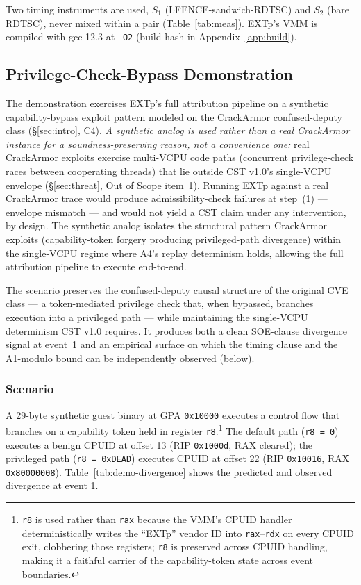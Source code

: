 \documentclass[conference]{IEEEtran}
\begin{document}
Two timing instruments are used, $S_1$ (LFENCE-sandwich-RDTSC) and
$S_2$ (bare RDTSC), never mixed within a pair (Table~\ref{tab:meas}).
EXTp's VMM is compiled with gcc 12.3
at \texttt{-O2} (build hash in Appendix~\ref{app:build}).

\subsection{Privilege-Check-Bypass Demonstration}\label{sec:eval-demo}

The demonstration exercises EXTp's full attribution pipeline on a
synthetic capability-bypass exploit pattern modeled on the
CrackArmor confused-deputy class (\S\ref{sec:intro}, C4).
\emph{A synthetic analog is used rather than a real CrackArmor
instance for a soundness-preserving reason, not a convenience one:}
real CrackArmor exploits exercise multi-VCPU code paths (concurrent
privilege-check races between cooperating threads) that lie outside
CST v1.0's single-VCPU envelope (\S\ref{sec:threat}, Out of Scope
item~1). Running EXTp against a real CrackArmor trace would produce
admissibility-check failures at step~(1) --- envelope mismatch ---
and would not yield a CST claim under any intervention, by design.
The synthetic analog isolates the structural pattern CrackArmor
exploits (capability-token forgery producing privileged-path
divergence) within the single-VCPU regime where A4's replay
determinism holds, allowing the full attribution pipeline to
execute end-to-end.

The scenario preserves the confused-deputy causal structure of the
original CVE class --- a token-mediated privilege check that, when
bypassed, branches execution into a privileged path --- while
maintaining the single-VCPU determinism CST v1.0 requires. It
produces both a clean SOE-clause divergence signal at event~1 and
an empirical surface on which the timing clause and the A1-modulo
bound can be independently observed (below).

\subsubsection{Scenario}

A 29-byte synthetic guest binary at GPA \texttt{0x10000} executes a
control flow that branches on a capability token held in register
\texttt{r8}.\footnote{\texttt{r8} is used rather than \texttt{rax}
because the VMM's CPUID handler deterministically writes the
``EXTp'' vendor ID into \texttt{rax}--\texttt{rdx} on every CPUID
exit, clobbering those registers; \texttt{r8}
is preserved across CPUID handling, making it a faithful carrier of
the capability-token state across event boundaries.} The default
path (\texttt{r8 = 0}) executes a benign CPUID at offset 13
(RIP \texttt{0x1000d}, RAX cleared); the privileged path
(\texttt{r8 = 0xDEAD}) executes CPUID at offset 22
(RIP \texttt{0x10016}, RAX \texttt{0x80000008}).
Table~\ref{tab:demo-divergence} shows the predicted and observed
divergence at event 1.
\end{document}
